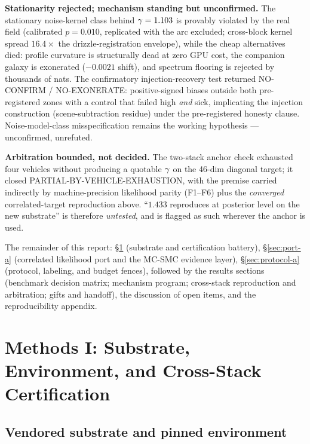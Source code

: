 \textbf{Stationarity rejected; mechanism standing but unconfirmed.} The
stationary noise-kernel class behind $\gamma=1.103$ is provably
violated by the real field (calibrated $p=0.010$, replicated with the arc
excluded; cross-block kernel spread $16.4\times$ the drizzle-registration
envelope), while the cheap alternatives died: profile curvature is
structurally dead at zero GPU cost, the companion galaxy is exonerated
($-0.0021$ shift), and spectrum flooring is rejected by thousands of nats.
The confirmatory injection-recovery test returned NO-CONFIRM /
NO-EXONERATE: positive-signed biases outside both pre-registered zones
with a control that failed high \emph{and} sick, implicating the injection
construction (scene-subtraction residue) under the pre-registered honesty
clause. Noise-model-class misspecification remains the working
hypothesis --- unconfirmed, unrefuted.

\textbf{Arbitration bounded, not decided.} The two-stack anchor check
exhausted four vehicles without producing a quotable $\gamma$ on the
46-dim diagonal target; it closed PARTIAL-BY-VEHICLE-EXHAUSTION, with the
premise carried indirectly by machine-precision likelihood parity (F1--F6)
plus the \emph{converged} correlated-target reproduction above. ``$1.433$
reproduces at posterior level on the new substrate'' is therefore
\emph{untested}, and is flagged as such wherever the anchor is used.

The remainder of this report: \S\ref{sec:substrate-a} (substrate and
certification battery), \S\ref{sec:port-a} (correlated likelihood port and
the MC-SMC evidence layer), \S\ref{sec:protocol-a} (protocol, labeling,
and budget fences), followed by the results sections (benchmark decision
matrix; mechanism program; cross-stack reproduction and arbitration;
gifts and handoff), the discussion of open items, and the reproducibility
appendix.

\section{Methods I: Substrate, Environment, and Cross-Stack Certification}
\label{sec:substrate-a}

\subsection{Vendored substrate and pinned environment}

